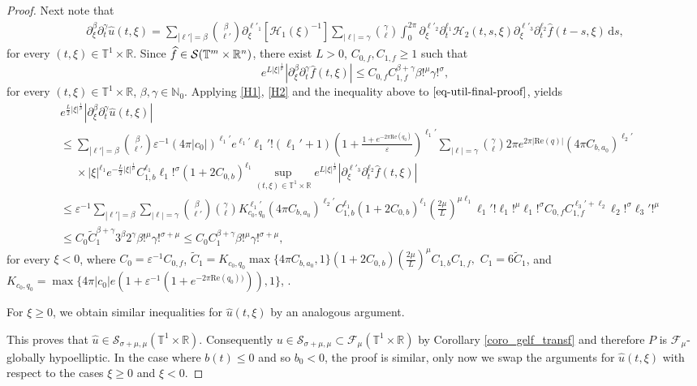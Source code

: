 \documentclass[10pt,a4paper]{amsart}
\newcommand{\G}{\mathnormal{\mathbb{T}^{m}\times\mathbb{R}^n}}
\newcommand{\N}{\mathbb{N}}
\newcommand{\R}{\mathbb{R}}
\newcommand{\Real}{\mathrm{Re}}
\newcommand{\Smu}{\mathscr{F}_{\mu}(\T^1\times\R)}
\newcommand{\T}{\mathbb{T}}
\newcommand{\g}{\mathbb{T}^1\times\mathbb{R}}
\newcommand{\s}{\mathcal{S}(\G)}
\begin{document}
\begin{proof}
Next note that
\begin{align}\label{eq-util-final-proof}
    \partial_\xi^\beta\partial_t^{\gamma}\widehat{u}(t,\xi)=\sum_{|\ell'|=\beta} \binom{\beta}{\ell'}\partial_\xi^{\ell'_1}[\mathcal{H}_1(\xi)^{-1}]\sum_{|\ell|=\gamma}\binom{\gamma}{\ell}\int_0^{2\pi}\partial_\xi^{\ell'_2}\partial_t^{\ell_1}\mathcal{H}_2(t,s,\xi)\partial_\xi^{\ell'_3}\partial_t^{\ell_2}\widehat{f}(t-s,\xi)\,\mathrm{d}s,
\end{align}
for every $(t,\xi)\in\T^1\times\R$. Since $\widehat{f}\in\s$, there exist $L>0$, $C_{0,f},C_{1,f}\geq 1$ such that
\begin{equation*}
    e^{L|\xi|^{\frac{1}{\mu}}}|\partial_\xi^\beta\partial_t^\gamma \widehat{f}(t,\xi)|\leq C_{0,f}C_{1,f}^{\beta+\gamma}\beta!^\mu\gamma!^\sigma,
\end{equation*}
for every $(t,\xi)\in\T^1\times\R$, $\beta,\gamma\in\N_0$.
Applying \eqref{H1}, \eqref{H2} and the inequality above to $\eqref{eq-util-final-proof}$, yields
\begin{align*}
    &e^{\frac{L}{2}|\xi|^{\frac{1}{\mu}}}|\partial_\xi^\beta\partial_t^{\gamma}\widehat{u}(t,\xi)|\\
    &\leq \sum_{|\ell'|=\beta} \binom{\beta}{\ell'}\varepsilon^{-1}(4\pi |c_0|)^{\ell_1'} e^{\ell_1'} \ell_1'!(\ell_1'+1)\left(1+\frac{1+e^{-2\pi  \Real(q_0)}}{\varepsilon}\right)^{\ell_1'}\sum_{|\ell|=\gamma}\binom{\gamma}{\ell}2\pi e^{2\pi|\Real(q)|}(4\pi C_{b,a_0})^{\ell_2'}\\
    & \phantom{\leq} \times |\xi|^{\ell_1}e^{-\frac{L}{2}|\xi|^{\frac{1}{\mu}}}C_{1,b}^{\ell_1}\ell_1!^\sigma (1+2C_{0,b})^{\ell_1}  \sup_{(t,\xi)\in\g}e^{L|\xi|^{\frac{1}{\mu}}}|\partial_\xi^{\ell'_3}\partial_t^{\ell_2}\widehat{f}(t,\xi)|\\
    &\leq \varepsilon^{-1} \sum_{|\ell'|=\beta} \sum_{|\ell|=\gamma}\binom{\beta}{\ell'}\binom{\gamma}{\ell}K_{c_0,q_0}^{\ell_1'}
    (4\pi C_{b,a_0})^{\ell_2'}C_{1,b}^{\ell_1} (1+2C_{0,b})^{\ell_1}\textstyle{(\frac{2\mu}{L})^{\mu\ell_1}}\ell_1'!\ell_1!^\mu\ell_1!^\sigma C_{0,f}C_{1,f}^{\ell_3'+\ell_2}\ell_2!^{\sigma}\ell_3'!^\mu\\
    &\leq C_0 \tilde{C}_{1}^{\beta+\gamma} 3^\beta 2^\gamma \beta!^{\mu}\gamma!^{\sigma+\mu}\leq C_0C_1^{\beta+\gamma}\beta!^\mu\gamma!^{\sigma+\mu},
\end{align*}
for every $\xi<0$, where $C_0=\varepsilon^{-1}C_{0,f}$, $\tilde{C}_1=K_{c_0,q_0}\max\{4\pi C_{b,a_0},1\}(1+2C_{0,b})(\frac{2\mu}{L})^\mu C_{1,b}C_{1,f},$ $C_1=6\tilde{C}_1$, and $K_{c_0,q_0}= \max\{4\pi|c_0|e\left(1+\varepsilon^{-1}\left(1+e^{-2\pi  \Real(q_0))}\right)\right),1\}$, .

For $\xi\geq0$, we obtain similar inequalities for $\widehat{u}(t,\xi)$ by an analogous argument. 

This proves that $\widehat{u}\in \mathcal{S}_{\sigma+\mu,\mu}(\g)$.  Consequently $u\in\mathcal{S}_{\sigma+\mu,\mu}\subset  \Smu$ by Corollary \ref{coro_gelf_transf} and therefore $P$ is $\mathscr{F}_{\mu}$-globally hypoelliptic. In the case where $b(t)\leq 0$ and so $b_0<0$, the proof is similar, only now we swap the arguments for $\widehat{u}(t,\xi)$ with respect to the cases $\xi\geq 0$ and $\xi<0$.
\end{proof}
\end{document}
